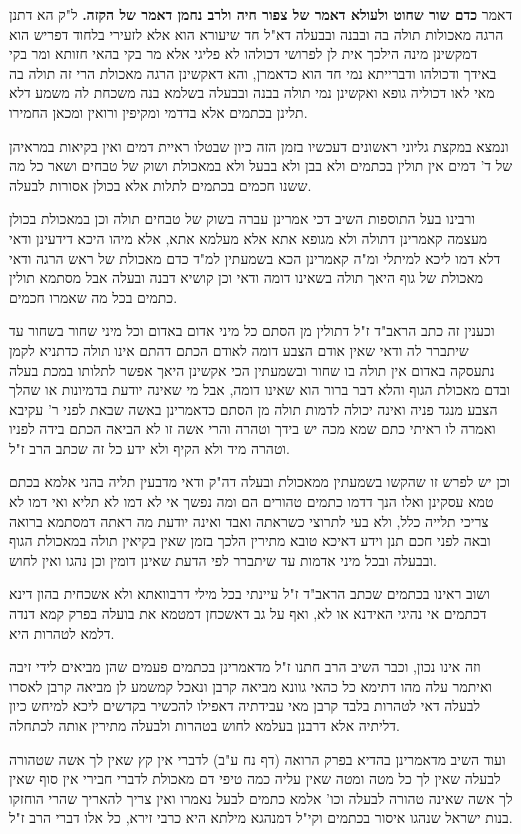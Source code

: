 \documentclass[12pt, openany]{book}
\begin{document}
{ דאמר \textbf{כדם שור שחוט ולעולא דאמר של צפור חיה ולרב נחמן דאמר של הקזה.}  ל"ק הא דתנן הרגה מאכולות תולה בה ובבנה ובבעלה דא"ל חד שיעורא הוא אלא לזעירי בלחוד דפריש הוא דמקשינן מינה הילכך אית לן לפרושי דכולהו לא פליגי אלא מר בקי בהאי חזותא ומר בקי באידך ודכולהו ודברייתא נמי חד הוא כדאמרן, והא דאקשינן הרגה מאכולת הרי זה תולה בה מאי לאו דכוליה גופא ואקשינן נמי תולה בבנה ובבעלה בשלמא בנה משכחת לה משמע דלא תלינן בכתמים אלא בדדמי ומקיפין ורואין ומכאן החמירו.\par  ונמצא במקצת גליוני ראשונים דעכשיו בזמן הזה כיון שבטלו ראיית דמים ואין בקיאות במראיהן של ד' דמים אין תולין בכתמים ולא בבן ולא בבעל ולא במאכולת ושוק של טבחים ושאר כל מה ששנו חכמים בכתמים לתלות אלא בכולן אסורות לבעלה.\par ורבינו בעל התוספות השיב דכי אמרינן עברה בשוק של טבחים תולה וכן במאכולת בכולן מעצמה קאמרינן דתולה ולא מגופא אתא אלא מעלמא אתא, אלא מיהו היכא דידעינן ודאי דלא דמו ליכא למיתלי ומ"ה קאמרינן הכא בשמעתין למ"ד כדם מאכולת של ראש הרגה ודאי מאכולת של גוף היאך תולה בשאינו דומה ודאי וכן קושיא דבנה ובעלה אבל מסתמא תולין כתמים בכל מה שאמרו חכמים.\par  וכענין זה כתב הראב"ד ז"ל דתולין מן הסתם כל מיני אדום באדום וכל מיני שחור בשחור עד שיתברר לה ודאי שאין אודם הצבע דומה לאודם הכתם דהתם אינו תולה כדתניא לקמן נתעסקה באדום אין תולה בו שחור ובשמעתין הכי אקשינן היאך אפשר לתלותו במכת בעלה ובדם מאכולת הגוף והלא דבר ברור הוא שאינו דומה, אבל מי שאינה יודעת בדמיונות או שהלך הצבע מנגד פניה ואינה יכולה לדמות תולה מן הסתם כדאמרינן באשה שבאת לפני ר' עקיבא ואמרה לו ראיתי כתם שמא מכה יש בידך וטהרה והרי אשה זו לא הביאה הכתם בידה לפניו וטהרה מיד ולא הקיף ולא ידע כל זה שכתב הרב ז"ל.\par וכן יש לפרש זו שהקשו בשמעתין ממאכולת ובעלה דה"ק ודאי מדבעין תליה בהני אלמא בכתם טמא עסקינן ואלו הנך דדמו כתמים טהורים הם ומה נפשך אי לא דמו לא תליא ואי דמו לא צריכי תלייה כלל, ולא בעי לתרוצי כשראתה ואבד ואינה יודעת מה ראתה דמסתמא ברואה ובאה לפני חכם תנן וידע דאיכא טובא מתירין הלכך בזמן שאין בקיאין תולה במאכולת הגוף ובבעלה ובכל מיני אדמות עד שיתברר לפי הדעת שאינן דומין וכן נהגו ואין לחוש.\par  ושוב ראינו בכתמים שכתב הראב"ד ז"ל עיינתי בכל מילי דרבוואתא ולא אשכחית בהון דינא דכתמים אי נהיגי האידנא או לא, ואף על גב דאשכחן דמטמא את בועלה בפרק קמא דנדה דלמא לטהרות היא.\par  וזה אינו נכון, וכבר השיב הרב חתנו ז"ל מדאמרינן בכתמים פעמים שהן מביאים לידי זיבה ואיתמר עלה מהו דתימא כל כהאי גוונא מביאה קרבן ונאכל קמשמע לן מביאה קרבן לאסרו לבעלה דאי לטהרות בלבד קרבן מאי עבידתיה דאפילו להכשיר בקדשים ליכא למיחש כיון דליתיה אלא דרבנן בעלמא לחוש בטהרות ולבעלה מתירין אותה לכתחלה.\par  ועוד השיב מדאמרינן בהדיא בפרק הרואה (דף נח ע"ב) לדברי אין קץ שאין לך אשה שטהורה לבעלה שאין לך כל מטה ומטה שאין עליה כמה טיפי דם מאכולת לדברי חבירי אין סוף שאין לך אשה שאינה טהורה לבעלה וכו' אלמא כתמים לבעל נאמרו ואין צריך להאריך שהרי הוחזקו בנות ישראל שנהגו איסור בכתמים וקי"ל דמנהגא מילתא היא כרבי זירא, כל אלו דברי הרב ז"ל. 
\par}
\end{document}
